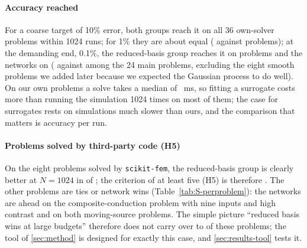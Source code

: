 \paragraph{Accuracy reached} For a coarse target of 10\% error, both groups reach it on all 36 own-solver problems within 1024 runs; for 1\% they are about equal (\BudgetLsOne{} against \BudgetNlOne{} problems); at the demanding end, 0.1\%, the reduced-basis group reaches it on \BudgetLsTenth{} problems and the networks on \BudgetNlTenth{} (\BudgetMainLsTenth{} against \BudgetMainNlTenth{} among the 24 main problems, excluding the eight smooth problems we added later because we expected the Gaussian process to do well). On our own problems a solve takes a median of \FomMedianMs{}~ms, so fitting a surrogate costs more than running the simulation 1024 times on most of them; the case for surrogates rests on simulations much slower than ours, and the comparison that matters is accuracy per run.
\paragraph{Problems solved by third-party code (H5)} On the eight problems solved by \texttt{scikit-fem}, the reduced-basis group is clearly better at $N=1024$ in \TpLsClear{} of \TpN{}; the criterion of at least five (H5) is therefore \textbf{\TpVerdict}. The other problems are ties or network wins (Table~\ref{tab:S-perproblem}): the networks are ahead on the composite-conduction problem with nine inputs and high contrast and on both moving-source problems. The simple picture ``reduced basis wins at large budgets'' therefore does not carry over to \TpNotClear{} of these \TpN{} problems; the tool of \cref{sec:method} is designed for exactly this case, and \cref{sec:results-tool} tests it.

